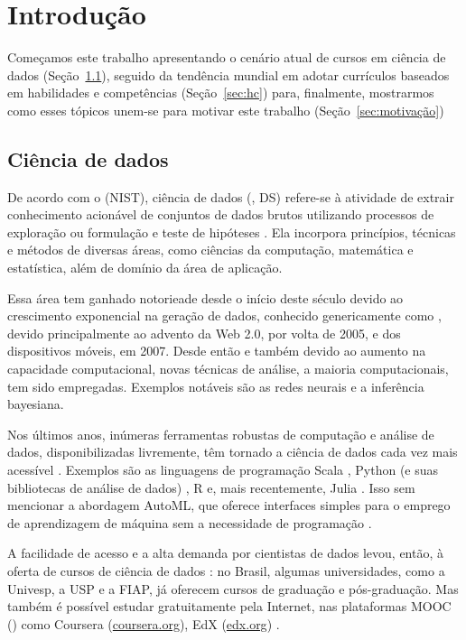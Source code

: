 \section{Introdução}

Começamos este trabalho apresentando o cenário atual de cursos em ciência de dados (Seção~\ref{sec:ds}), seguido da tendência mundial em adotar currículos baseados em habilidades e competências (Seção~\ref{sec:hc}) para, finalmente, mostrarmos como esses tópicos unem-se para motivar este trabalho (Seção~\ref{sec:motivação})

\subsection{Ciência de dados}\label{sec:ds}

De acordo com o  (NIST), ciência de dados (, DS) refere-se à atividade de extrair conhecimento acionável de conjuntos de dados brutos utilizando processos de exploração ou formulação e teste de hipóteses \cite[p.~7]{NBDIF2015}.
Ela incorpora princípios, técnicas e métodos de diversas áreas, como ciências da computação, matemática e estatística, além de domínio da área de aplicação.

Essa área tem ganhado notorieade desde o início deste século devido ao crescimento exponencial na geração de dados, conhecido genericamente como , devido principalmente ao advento da Web 2.0, por volta de 2005, e dos dispositivos móveis, em 2007.
Desde então e também devido ao aumento na capacidade computacional, novas técnicas de análise, a maioria computacionais, tem sido empregadas.
Exemplos notáveis são as redes neurais e a inferência bayesiana.

Nos últimos anos, inúmeras ferramentas robustas de computação e análise de dados, disponibilizadas livremente, têm tornado a ciência de dados cada vez mais acessível \cite{Hayes2019}.
Exemplos são as linguagens de programação Scala \cite{Bugnion2016}, Python (e suas bibliotecas de análise de dados) \cite{Nagpal2019, McKinney2013}, R \cite{James2013} e, mais recentemente, Julia \cite{McNicholas2019}.
Isso sem mencionar a abordagem AutoML, que oferece interfaces simples para o emprego de aprendizagem de máquina sem a necessidade de programação \cite{He2020}.

A facilidade de acesso e a alta demanda por cientistas de dados levou, então, à oferta de cursos de ciência de dados \cite{Hassan2019}: no Brasil, algumas universidades, como a Univesp, a USP e a FIAP, já oferecem cursos de graduação e pós-graduação.
Mas também é possível estudar gratuitamente pela Internet, nas plataformas MOOC () como Coursera (\url{coursera.org}), EdX (\url{edx.org}) \etc.

